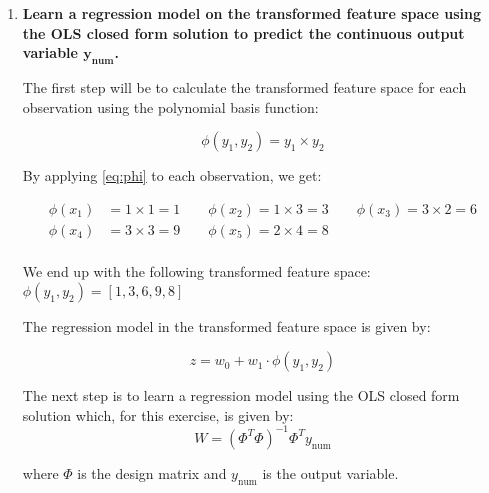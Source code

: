 \documentclass[12pt]{article}
\begin{document}
\begin{enumerate}
    \item \textbf{Learn a regression model on the transformed feature space using the OLS closed form
    solution to predict the continuous output variable $\mathbf{y_{\text{num}}}$.}
    
    \vspace{10pt}
    The first step will be to calculate the transformed feature space for each observation using the polynomial basis function:
    
    \begin{equation}\label{eq:phi}
        \phi(y_1, y_2) = y_1 \times y_2
    \end{equation}

    By applying \eqref{eq:phi} to each observation, we get:

    \begin{equation*}
        \begin{aligned}
            \phi(x_1) &= 1 \times 1 = 1 \qquad \phi(x_2) = 1 \times 3 = 3 \qquad \phi(x_3) = 3 \times 2 = 6\\
            \phi(x_4) &= 3 \times 3 = 9 \qquad \phi(x_5) = 2 \times 4 = 8 \\
        \end{aligned}
    \end{equation*}

    \vspace{10pt}
    We end up with the following transformed feature space: $\phi(y_1, y_2) = [1, 3, 6, 9, 8]$
    
    \vspace{10pt}
    The regression model in the transformed feature space is given by:
    
    \begin{equation*}
        z = w_0 + w_1 \cdot \phi(y_1, y_2)
    \end{equation*}

    \vspace{10pt}
    The next step is to learn a regression model using the OLS closed form solution which, for this exercise, is given by:
    \begin{equation*}
        W = (\Phi^T \Phi)^{-1} \Phi^T y_\text{num}
    \end{equation*}

    where $\Phi$ is the design matrix and $y_\text{num}$ is the output variable. 


\end{enumerate}
\end{document}
